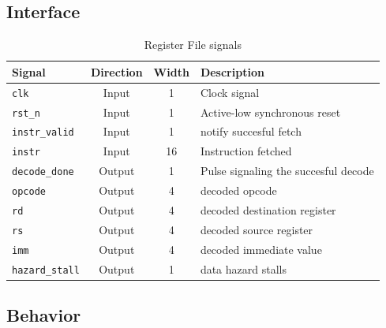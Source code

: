 \subsection{Interface}

\begin{table}[h!]
    \centering
    \begin{tabular}{|l|c|c|l|}
        \hline
        \textbf{Signal}         & \textbf{Direction} & \textbf{Width} & \textbf{Description}                    \\ \hline
        \texttt{clk}            & Input              & 1              & Clock signal                            \\ \hline
        \texttt{rst\_n}         & Input              & 1              & Active-low synchronous reset            \\ \hline
        \texttt{instr\_valid}   & Input              & 1              & notify succesful fetch                  \\ \hline
        \texttt{instr}          & Input              & 16             & Instruction fetched                     \\ \hline
        \texttt{decode\_done}   & Output             & 1              & Pulse signaling the succesful decode    \\ \hline
        \texttt{opcode}         & Output             & 4              & decoded opcode                          \\ \hline
        \texttt{rd}             & Output             & 4              & decoded destination register            \\ \hline
        \texttt{rs}             & Output             & 4              & decoded source register                 \\ \hline
        \texttt{imm}            & Output             & 4              & decoded immediate value                 \\ \hline
        \texttt{hazard\_stall}  & Output             & 1              & data hazard stalls                      \\ \hline
    \end{tabular}
    \caption{Register File signals}
\end{table}

\subsection{Behavior}

